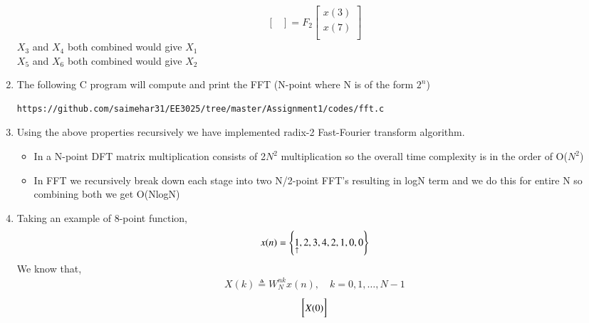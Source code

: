 \documentclass[journal,12pt,twocolumn]{IEEEtran}
\renewcommand\thesection{\arabic{section}}
\begin{document}
\begin{enumerate}[label=\thesection.\arabic*.,ref=\thesection.\theenumi]
\begin{equation}
\begin{bmatrix}
\end{bmatrix}
= F_{2}
\begin{bmatrix}
x(3) \\ 
x(7) \\ 
\end{bmatrix}
\end{equation}
$X_{3}$ and $X_{4}$ both combined would give $X_{1}$\\
$X_{5}$ and $X_{6}$ both combined would give $X_{2}$ 
\item The following C program will compute and print the FFT (N-point where N is of the form $2^{n}$)
\begin{lstlisting}
https://github.com/saimehar31/EE3025/tree/master/Assignment1/codes/fft.c
\end{lstlisting}
\item Using the above properties recursively we have implemented radix-2 Fast-Fourier transform algorithm.
\begin{itemize}
    \item In a N-point DFT matrix multiplication consists of 2$N^{2}$ multiplication so the overall time complexity is in the order of O($N^{2}$)
    \item In FFT we recursively break down each stage into two N/2-point FFT's resulting in logN term and we do this for entire N so combining both we get O(NlogN)
\end{itemize}
\item
Taking an example of 8-point function,
\begin{align}
    x(n) = \left\{\underset{\uparrow}{1},2,3,4,2,1,0,0\right\} 
\end{align}
We know that,
\begin{align}
        X(k) \triangleq W_{N}^{nk} x(n), \quad k=0,1, \ldots, N-1
\end{align}
\begin{equation}
\renewcommand{\arraystretch}{1.35}
\setlength\arraycolsep{0.05pt}
\begin{bmatrix}
X(0) \\

\end{bmatrix}
\end{equation}
\end{enumerate}
\end{document}
